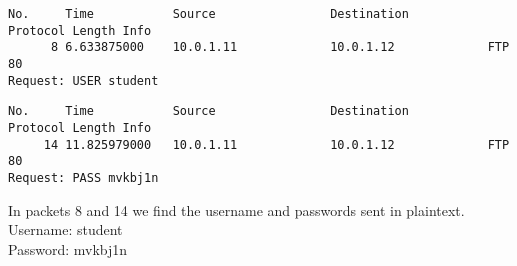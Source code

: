 \begin{lstlisting}
No.     Time           Source                Destination           Protocol Length Info
      8 6.633875000    10.0.1.11             10.0.1.12             FTP      80     
Request: USER student
\end{lstlisting}
\begin{lstlisting}
No.     Time           Source                Destination           Protocol Length Info
     14 11.825979000   10.0.1.11             10.0.1.12             FTP      80     
Request: PASS mvkbj1n
\end{lstlisting}

In packets 8 and 14 we find the username and passwords sent in plaintext.\\
Username: student\\
Password: mvkbj1n